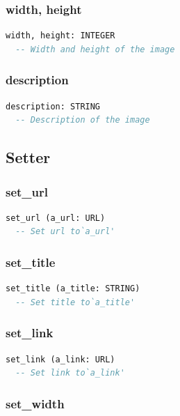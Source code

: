\subsubsection{width, height}

\begin{lstlisting}[language=Eiffel]
width, height: INTEGER
  -- Width and height of the image
\end{lstlisting}

\subsubsection{description}

\begin{lstlisting}[language=Eiffel]
description: STRING
  -- Description of the image
\end{lstlisting}

\subsection{Setter}
\label{sec:channel-image-setter}

\subsubsection{set\_url}

\begin{lstlisting}[language=Eiffel]
set_url (a_url: URL)
  -- Set url to`a_url'
\end{lstlisting}

\subsubsection{set\_title}

\begin{lstlisting}[language=Eiffel]
set_title (a_title: STRING)
  -- Set title to`a_title'
\end{lstlisting}

\subsubsection{set\_link}

\begin{lstlisting}[language=Eiffel]
set_link (a_link: URL)
  -- Set link to`a_link'
\end{lstlisting}

\subsubsection{set\_width}

